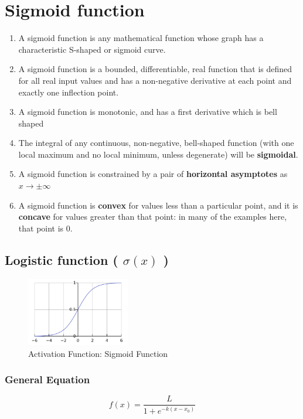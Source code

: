 \section{Sigmoid function \cite{wiki-activation-fn,wiki-Sigmoid_function}}

\begin{enumerate}
    \item A sigmoid function is any mathematical function whose graph has a characteristic S-shaped or sigmoid curve.
    \item A sigmoid function is a bounded, differentiable, real function that is defined for all real input values and has a non-negative derivative at each point and exactly one inflection point.
    \item A sigmoid function is monotonic, and has a first derivative which is bell shaped
    \item The integral of any continuous, non-negative, bell-shaped function (with one local maximum and no local minimum, unless degenerate) will be \textbf{sigmoidal}.
    \item A sigmoid function is constrained by a pair of \textbf{horizontal asymptotes} as $x\rightarrow \pm \infty$
    \item A sigmoid function is \textbf{convex} for values less than a particular point, and it is \textbf{concave} for values greater than that point: in many of the examples here, that point is 0.
\end{enumerate}

\subsection{Logistic function ( $\sigma(x)$ ) \cite{wiki-Logistic_function,wiki-Sigmoid_function}}\label{Logistic function}

\begin{figure}[H]
    \centering
    \includegraphics[height=3cm]{Pictures/activation-fns/sigmoid-fn.jpg}
    \caption{Activation Function: Sigmoid Function}
\end{figure}

\subsubsection{General Equation \cite{wiki-Logistic_function,wiki-Sigmoid_function}}
\[
    f(x) = {\dfrac{L}{1 + e^{-k(x - x_{0})}}}
\]


